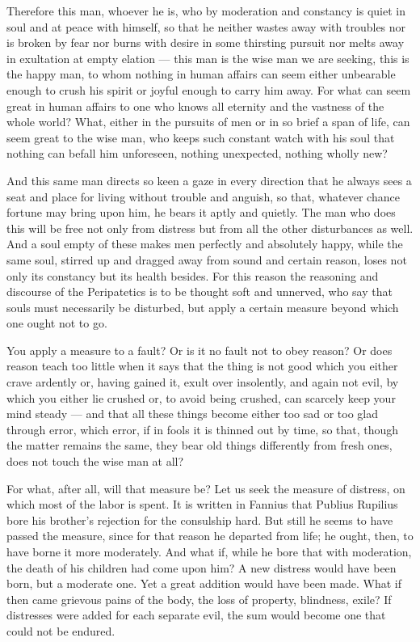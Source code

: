  Therefore this man, whoever he is, who by moderation and constancy is quiet in soul and at peace with himself, so that he neither wastes away with troubles nor is broken by fear nor burns with desire in some thirsting pursuit nor melts away in exultation at empty elation — this man is the wise man we are seeking, this is the happy man, to whom nothing in human affairs can seem either unbearable enough to crush his spirit or joyful enough to carry him away. For what can seem great in human affairs to one who knows all eternity and the vastness of the whole world? What, either in the pursuits of men or in so brief a span of life, can seem great to the wise man, who keeps such constant watch with his soul that nothing can befall him unforeseen, nothing unexpected, nothing wholly new?

 And this same man directs so keen a gaze in every direction that he always sees a seat and place for living without trouble and anguish, so that, whatever chance fortune may bring upon him, he bears it aptly and quietly. The man who does this will be free not only from distress but from all the other disturbances as well. And a soul empty of these makes men perfectly and absolutely happy, while the same soul, stirred up and dragged away from sound and certain reason, loses not only its constancy but its health besides. For this reason the reasoning and discourse of the Peripatetics is to be thought soft and unnerved, who say that souls must necessarily be disturbed, but apply a certain measure beyond which one ought not to go.

 You apply a measure to a fault? Or is it no fault not to obey reason? Or does reason teach too little when it says that the thing is not good which you either crave ardently or, having gained it, exult over insolently, and again not evil, by which you either lie crushed or, to avoid being crushed, can scarcely keep your mind steady — and that all these things become either too sad or too glad through error, which error, if in fools it is thinned out by time, so that, though the matter remains the same, they bear old things differently from fresh ones, does not touch the wise man at all?

 For what, after all, will that measure be? Let us seek the measure of distress, on which most of the labor is spent. It is written in Fannius that Publius Rupilius bore his brother's rejection for the consulship hard. But still he seems to have passed the measure, since for that reason he departed from life; he ought, then, to have borne it more moderately. And what if, while he bore that with moderation, the death of his children had come upon him? A new distress would have been born, but a moderate one. Yet a great addition would have been made. What if then came grievous pains of the body, the loss of property, blindness, exile? If distresses were added for each separate evil, the sum would become one that could not be endured.

